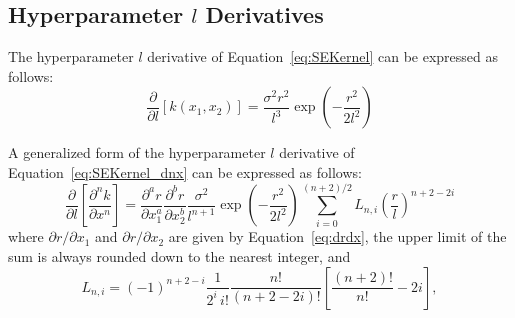 \documentclass{article}
\begin{document}
\subsection{Hyperparameter $l$ Derivatives}
\label{subsec:SEHypDer_l}

The hyperparameter $l$ derivative of Equation~\eqref{eq:SEKernel} can be expressed as follows:
\begin{equation}
\label{eq:SEKernel_dl}
	\frac{\partial}{\partial l} \left[k\!\left(x_1,x_2\right)\right] = \frac{\sigma^2 r^2}{l^3} \exp{\left(-\frac{r^2}{2l^2}\right)}
\end{equation}

\begin{comment}
\begin{equation}
\label{eq:SEKernel_dl_d1x}
	\begin{gathered}
	\frac{\partial}{\partial l} \left[\frac{\partial k\!\left(x_1,x_2\right)}{\partial x_1}\right] = - \frac{\partial r}{\partial x_1} \frac{\sigma^2 r}{l^3} \left(\frac{r^2}{l^2} - 2\right) \exp{\left(-\frac{r^2}{2l^2}\right)} \\
	\frac{\partial}{\partial l} \left[\frac{\partial k\!\left(x_1,x_2\right)}{\partial x_2}\right] = - \frac{\partial r}{\partial x_2} \frac{\sigma^2 r}{l^3} \left(\frac{r^2}{l^2} - 2\right) \exp{\left(-\frac{r^2}{2l^2}\right)}
	\end{gathered}
\end{equation}

\begin{equation}
\label{eq:SEKernel_dl_d2x}
	\frac{\partial}{\partial l} \left[\frac{\partial^2 k\!\left(x_1,x_2\right)}{\partial x_1 \partial x_2}\right] = \frac{\partial r}{\partial x_1} \frac{\partial r}{\partial x_2} \frac{\sigma^2}{l^3} \left(\frac{r^4}{l^4} - \frac{5r^2}{l^2} + 3\right) \exp{\left(-\frac{r^2}{2l^2}\right)}
\end{equation}
\end{comment}

A generalized form of the hyperparameter $l$ derivative of Equation~\eqref{eq:SEKernel_dnx} can be expressed as follows:
\begin{equation}
\label{eq:SEKernel_dl_dnx}
	\frac{\partial}{\partial l} \left[\frac{\partial^n k}{\partial x^n}\right] = \frac{\partial^a r}{\partial x_1^a} \frac{\partial^b r}{\partial x_2^b} \frac{\sigma^2}{l^{n+1}} \exp{\left(-\frac{r^2}{2l^2}\right)} \sum_{i=0}^{\left(n+2\right)/2} L_{n,i} \left(\frac{r}{l}\right)^{n+2-2i}
\end{equation}
where $\partial r/\partial x_1$ and $\partial r/\partial x_2$ are given by Equation~\eqref{eq:drdx}, the upper limit of the sum is always rounded down to the nearest integer, and
\begin{equation}
\label{eq:Coefficient_dl_dnx}
	L_{n,i} = \left(-1\right)^{n+2-i} \frac{1}{2^i \, i!} \frac{n!}{\left(n + 2 - 2i\right)!} \left[\frac{\left(n + 2\right)!}{n!} - 2i\right],
\end{equation}
\end{document}
